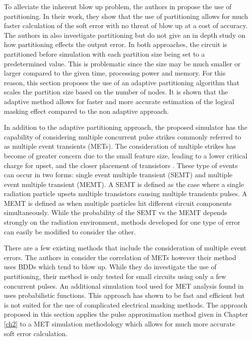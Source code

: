To alleviate the inherent blow up problem, the authors in \cite{FASER} propose the use of partitioning. In their work, they show that the use of partitioning allows for much faster calculation of the soft error with no threat of blow up at a cost of accuracy. The authors in \cite{METSys} also investigate partitioning but do not give an in depth study on how partitioning effects the output error. In both approaches, the circuit is partitioned before simulation with each partition size being set to a predetermined value. This is problematic since the size may be much smaller or larger compared to the given time, processing power and memory. For this reason, this section proposes the use of an adaptive partitioning algorithm that scales the partition size based on the number of nodes. It is shown that the adaptive method allows for faster and more accurate estimation of the logical masking effect compared to the non adaptive approach.

In addition to the adaptive partitioning approach, the proposed simulator has the capability of considering multiple concurrent pulse strikes commonly referred to as multiple event transients (METs). The consideration of multiple strikes has become of greater concern due to the small feature size, leading to a lower critical charge for upset, and the closer placement of transistors \cite{Rossi2005}. These type of events can occur in two forms: single event multiple transient (SEMT) and multiple event multiple transient (MEMT). A SEMT is defined as the case where a single radiation particle upsets multiple transistors causing multiple transients pulses. A MEMT is defined as when multiple particles hit different circuit components simultaneously. While the probability of the SEMT vs the MEMT depends strongly on the radiation environment, methods developed for one type of error can easily be modified to consider the other. 

There are a few existing methods that include the consideration of multiple event errors. The authors in \cite{METSys} consider the correlation of METs however their method uses BDDs which tend to blow up. While they do investigate the use of partitioning, their method is only tested for small circuits using only a few concurrent pulses. An additional simulation tool used for MET analysis found in \cite{Fazeli2011} uses probabilistic functions. This approach has shown to be fast and efficient but is not suited for the use of complicated electrical masking methods. The approach proposed in this section applies the pulse approximation method given in Chapter \ref{ch2} to a MET simulation methodology which allows for much more accurate soft error calculation.

